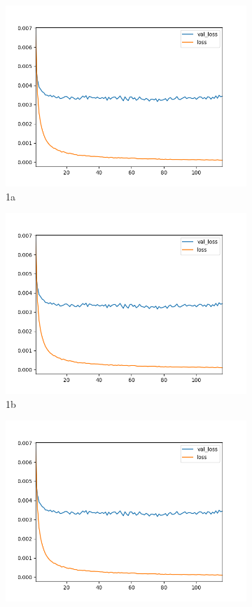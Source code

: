 \begin{figure}
\begin{subfigure}{.5\textwidth}
  \centering
  \includegraphics[width=.8\linewidth]{figuras/ape-ajustes-hiper-parametros/training-cnn-1000-k-2.png}
  \caption{1a}
  \label{fig:sfig1}
\end{subfigure}%
\begin{subfigure}{.5\textwidth}
  \centering
  \includegraphics[width=.8\linewidth]{figuras/ape-ajustes-hiper-parametros/training-cnn-1000-k-2.png}
  \caption{1b}
  \label{fig:sfig2}
\end{subfigure}
\begin{subfigure}{.5\textwidth}
  \centering
  \includegraphics[width=.8\linewidth]{figuras/ape-ajustes-hiper-parametros/training-cnn-1000-k-2.png}

\end{subfigure}
\end{figure}
